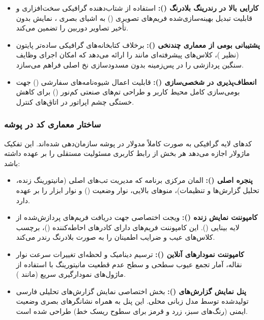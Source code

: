 \documentclass[a4paper, 10pt, twocolumn]{article}
\begin{document}
	\begin{itemize}
		\item \textbf{کارایی بالا در رندرینگ بلادرنگ ():} استفاده از شتاب‌دهنده گرافیکی سخت‌افزاری و قابلیت تبدیل بهینه‌سازی‌شده فریم‌های تصویری () به اشیای بصری ، نمایش بدون تأخیر تصاویر دوربین را تضمین می‌کند.
		\item \textbf{پشتیبانی بومی از معماری چندنخی ():} برخلاف کتابخانه‌های گرافیکی ساده‌تر پایتون (نظیر )،  کلاس‌های پیشرفته‌ای مانند  را ارائه می‌دهد که امکان اجرای وظایف سنگین پردازشی را در پس‌زمینه بدون مسدودسازی نخ اصلی فراهم می‌سازد.
		\item \textbf{انعطاف‌پذیری در شخصی‌سازی ():} قابلیت اعمال شیوه‌نامه‌های سفارشی () جهت بومی‌سازی کامل محیط کاربر و طراحی تم‌های صنعتی کم‌نور () برای کاهش خستگی چشم اپراتور در اتاق‌های کنترل.
	\end{itemize}
	
	\subsubsection{ساختار معماری کد در پوشه }
	کدهای لایه گرافیکی به صورت کاملاً مدولار در پوشه  سازمان‌دهی شده‌اند. این تفکیک ماژولار اجازه می‌دهد هر بخش از رابط کاربری مسئولیت مستقلی را بر عهده داشته باشد:
	
	\begin{itemize}
		\item \textbf{پنجره اصلی ():} المان مرکزی برنامه که مدیریت تب‌های اصلی (مانیتورینگ زنده، تحلیل گزارش‌ها و تنظیمات)، منوهای بالایی، نوار وضعیت () و نوار ابزار را بر عهده دارد.
		\item \textbf{کامپوننت نمایش زنده ():} ویجت اختصاصی جهت دریافت فریم‌های پردازش‌شده از لایه بینایی (). این کامپوننت فریم‌های دارای کادرهای احاطه‌کننده ()، برچسب کلاس‌های عیب و ضرایب اطمینان را به صورت بلادرنگ رندر می‌کند.
		\item \textbf{کامپوننت نمودارهای آنلاین ():} ترسیم دینامیک و لحظه‌ای تغییرات سرعت نوار نقاله، آمار تجمع عیوب سطحی و سطح عدم قطعیت مانیتورینگ با استفاده از ماژول‌های نمودارگیری سریع (مانند ).
		\item \textbf{پنل نمایش گزارش‌های  ():} بخش اختصاصی نمایش گزارش‌های تحلیلی فارسی تولیدشده توسط مدل زبانی محلی. این پنل به همراه نشانگرهای بصری وضعیت ایمنی (رنگ‌های سبز، زرد و قرمز برای سطوح ریسک خط) طراحی شده است.
	\end{itemize}
	
\end{document}
